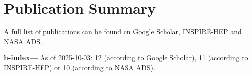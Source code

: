 \newcommand{\arxiv}[1]{[\href{http://arxiv.org/abs/#1}{arXiv:#1}]}
\def\zero{0}
\def\one{1}
\newcommand{\citeCount}[1]{%
    \def\val{#1}
    \ifx\val\zero%
    \else%
        \ifx\val\one%
        (1~citation)%
        \else%
        (#1~citations)%
        \fi%
    \fi
}


\def\apj{Astrophys.\ J.}
\def\apjs{Astrophys.\ J.\ Suppl.\ Ser.}
\def\cqg{Class.\ Quantum\ Gravity}
\def\joss{J.\ Open\ Source\ Softw.}
\def\mnras{Mon.\ Not.\ R.\ Astron.\ Soc.}
\def\prd{Phys.\ Rev.\ D}
\def\prl{Phys.\ Rev.\ Lett.}


\setcounter{numPubs}{24}
\setcounter{pubCounter}{\value{numPubs}}


\newif\ifshowpubsummary
\showpubsummarytrue
\ifshowpubsummary
\section{Publication Summary}

A full list of publications can be found on
\href{https://scholar.google.com/citations?hl=en&user=jET8KxgAAAAJ}%
{Google Scholar},
\href{https://inspirehep.net/authors/1798261}%
{INSPIRE-HEP}
and
\href{https://ui.adsabs.harvard.edu/user/libraries/SDMGXaKoRomaOJsefpo2yQ}%
{NASA ADS}.


\textbf{h-index---}%
As of 2025-10-03: 12 (according to Google Scholar),
11 (according to INSPIRE-HEP)
or 10 (according to NASA ADS).

